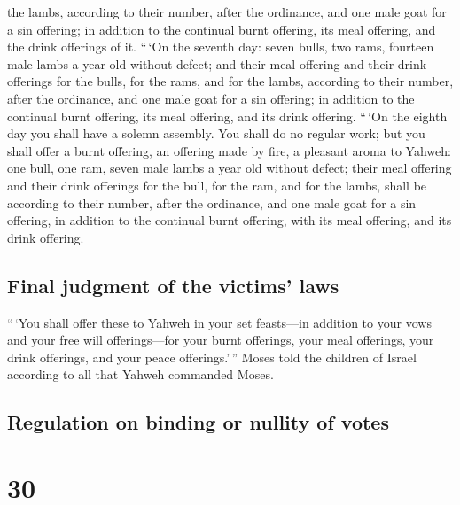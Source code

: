 the lambs, according to their number, after the ordinance,
 and one male goat for a sin offering; in addition to the
continual burnt offering, its meal offering, and the drink offerings of
it.  ``\,`On the seventh day: seven bulls, two rams,
fourteen male lambs a year old without defect;  and their
meal offering and their drink offerings for the bulls, for the rams, and
for the lambs, according to their number, after the ordinance,
 and one male goat for a sin offering; in addition to the
continual burnt offering, its meal offering, and its drink offering.
 ``\,`On the eighth day you shall have a solemn assembly.
You shall do no regular work;  but you shall offer a
burnt offering, an offering made by fire, a pleasant aroma to Yahweh:
one bull, one ram, seven male lambs a year old without defect;
 their meal offering and their drink offerings for the
bull, for the ram, and for the lambs, shall be according to their
number, after the ordinance,  and one male goat for a sin
offering, in addition to the continual burnt offering, with its meal
offering, and its drink offering.

\hypertarget{final-judgment-of-the-victims-laws}{%
\subsection{Final judgment of the victims'
laws}\label{final-judgment-of-the-victims-laws}}

 ``\,`You shall offer these to Yahweh in your set
feasts---in addition to your vows and your free will offerings---for
your burnt offerings, your meal offerings, your drink offerings, and
your peace offerings.'\,''  Moses told the children of
Israel according to all that Yahweh commanded Moses.

\hypertarget{regulation-on-binding-or-nullity-of-votes}{%
\subsection{Regulation on binding or nullity of
votes}\label{regulation-on-binding-or-nullity-of-votes}}

\hypertarget{section-29}{%
\section{30}\label{section-29}}

